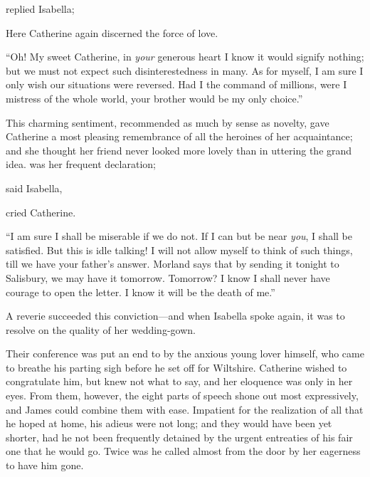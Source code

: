  replied Isabella; 

Here Catherine again discerned the force of love.


“Oh! My sweet Catherine, in {\em your} generous heart I know it would signify nothing; but we must not expect such disinterestedness in many. As for myself, I am sure I only wish our situations were reversed. Had I the command of millions, were I mistress of the whole world, your brother would be my only choice.”

This charming sentiment, recommended as much by sense as novelty, gave Catherine a most pleasing remembrance of all the heroines of her acquaintance; and she thought her friend never looked more lovely than in uttering the grand idea.  was her frequent declaration; 

 said Isabella, 

 cried Catherine. 

“I am sure I shall be miserable if we do not. If I can but be near {\em you}, I shall be satisfied. But this is idle talking! I will not allow myself to think of such things, till we have your father's answer. Morland says that by sending it tonight to Salisbury, we may have it tomorrow. Tomorrow? I know I shall never have courage to open the letter. I know it will be the death of me.”

A reverie succeeded this conviction---and when Isabella spoke again, it was to resolve on the quality of her wedding-gown.

Their conference was put an end to by the anxious young lover himself, who came to breathe his parting sigh before he set off for Wiltshire. Catherine wished to congratulate him, but knew not what to say, and her eloquence was only in her eyes. From them, however, the eight parts of speech shone out most expressively, and James could combine them with ease. Impatient for the realization of all that he hoped at home, his adieus were not long; and they would have been yet shorter, had he not been frequently detained by the urgent entreaties of his fair one that he would go. Twice was he called almost from the door by her eagerness to have him gone. 

